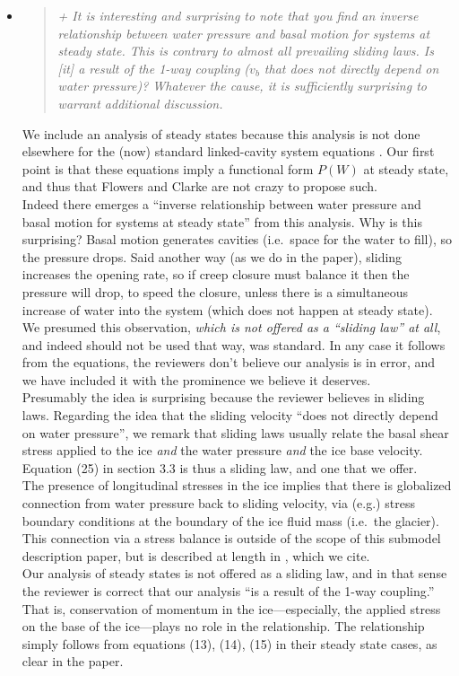 \documentclass[11pt,reqno]{amsart}
\newcommand{\reply}[2]{
\medskip\medskip
\item  \begin{quote}
\emph{#1}
\end{quote}

\medskip
\noindent #2}
\begin{document}
\begin{itemize}
\reply{\label{inversepage} + It is interesting and surprising to note that you find an inverse relationship between water pressure and basal motion for systems at steady state. This is contrary to almost all prevailing sliding laws.  Is [it] a result of the 1-way coupling ($v_b$ that does not directly depend on water pressure)? Whatever the cause, it is sufficiently surprising to warrant additional discussion.}
{We include an analysis of steady states because this analysis is not done elsewhere for the (now) standard linked-cavity system equations \cite{Hewitt2011,Schoofetal2012}.  Our first point is that these equations imply a functional form $P(W)$ at steady state, and thus that Flowers and Clarke \cite{FlowersClarke2002} are not crazy to propose such.\\
\indent Indeed there emerges a ``inverse relationship between water pressure and basal motion for systems at steady state'' from this analysis.  Why is this surprising?  Basal motion generates cavities (i.e.~space for the water to fill), so the pressure drops.  Said another way (as we do in the paper), sliding increases the opening rate, so if creep closure must balance it then the pressure will drop, to speed the closure, unless there is a simultaneous increase of water into the system (which does not happen at steady state).  We presumed this observation, \emph{which is not offered as a ``sliding law'' at all}, and indeed should not be used that way, was standard.  In any case it follows from the equations, the reviewers don't believe our analysis is in error, and we have included it with the prominence we believe it deserves. \\
\indent Presumably the idea is surprising because the reviewer believes in sliding laws.  Regarding the idea that the sliding velocity ``does not directly
depend on water pressure'', we remark that sliding laws usually relate the basal shear stress applied to the ice \emph{and} the water pressure \emph{and} the ice base velocity.  Equation (25) in section 3.3 is thus a sliding law, and one that we offer. \\
\indent  The presence of longitudinal stresses in the ice implies that there is globalized connection from water pressure back to sliding velocity, via (e.g.) stress boundary conditions at the boundary of the ice fluid mass (i.e.~the glacier).  This connection via a stress balance is outside of the scope of this submodel description paper, but is described at length in \cite{BBssasliding}, which we cite.\\
\indent Our analysis of steady states is not offered as a sliding law, and in that sense the reviewer is correct that our analysis ``is a result of the 1-way coupling.'' That is, conservation of momentum in the ice---especially, the applied stress  on the base of the ice---plays no role in the relationship.  The relationship simply follows from equations (13), (14), (15) in their steady state cases, as clear in the paper.}


\end{itemize}
\end{document}
